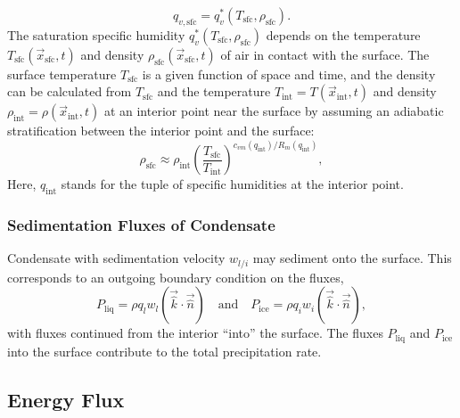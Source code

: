 \documentclass{report}
\begin{document}
\begin{enumerate}
     \[
    q_{v, \mathrm{sfc}} =q_v^*(T_\mathrm{sfc}, \rho_\mathrm{sfc}).
    \]
    The saturation specific humidity $q_v^*(T_\mathrm{sfc}, \rho_\mathrm{sfc})$ depends on the temperature $T_\mathrm{sfc}(\vec{x}_\mathrm{sfc}, t)$ and density $\rho_\mathrm{sfc}(\vec{x}_\mathrm{sfc}, t)$ of air in contact with the surface. The surface temperature $T_\mathrm{sfc}$ is a given function of space and time, and the density can be calculated from $T_\mathrm{sfc}$ and the temperature $T_\mathrm{int} = T(\vec{x}_\mathrm{int}, t)$ and density $\rho_\mathrm{int} = \rho(\vec{x}_\mathrm{int}, t)$ at an interior point near the surface by assuming an adiabatic stratification between the interior point and the surface:
    \begin{equation}\label{e:sfc_density}
    \rho_\mathrm{sfc} \approx \rho_\mathrm{int} \left( \frac{T_\mathrm{sfc}}{T_\mathrm{int}} \right)^{c_{vm}(q_\mathrm{int})/R_m(q_\mathrm{int})},
    \end{equation}
    Here, $q_\mathrm{int}$ stands for the tuple of specific humidities at the interior point.
\end{enumerate}

\subsubsection{Sedimentation Fluxes of Condensate}

Condensate with sedimentation velocity $w_{l/i}$ may sediment onto the surface. This corresponds to an outgoing boundary condition on the fluxes,
\begin{equation}
    P_{\mathrm{liq}} = \rho q_{l} w_{l} (\vec{\hat k} \cdot \vec{\hat n}) \quad \text{and} \quad  P_{\mathrm{ice}} = \rho q_{i} w_{i} (\vec{\hat k} \cdot \vec{\hat n}),
\end{equation}
with fluxes continued from the interior ``into'' the surface. The fluxes $P_{\mathrm{liq}}$ and $P_{\mathrm{ice}}$ into the surface contribute to the total precipitation rate.

\subsection{Energy Flux}
\end{document}
